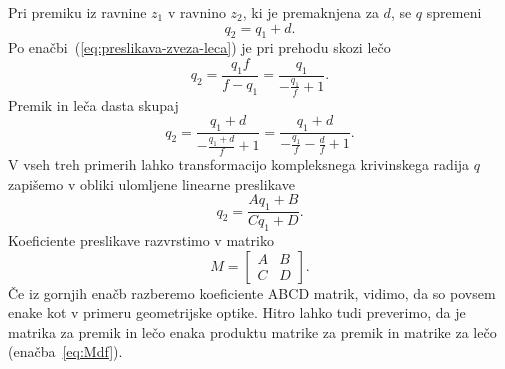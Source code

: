 Pri premiku iz ravnine $z_1$ v ravnino $z_2$, ki je premaknjena
za $d$, se $q$ spremeni 
\begin{equation}
q_2=q_1+d.
\end{equation}
Po enačbi~(\ref{eq:preslikava-zveza-leca}) je pri prehodu skozi lečo
\begin{equation}
q_2=\frac{q_1f}{f-q_1}=\frac{q_1}{-\frac{q_1}{f}+1}.
\end{equation}
Premik in leča dasta skupaj
\begin{equation}
q_2=\frac{q_1+d}{-\frac{q_1+d}{f}+1}=\frac{q_1+d}{-\frac{q_1}{f}-\frac{d}{f}+1}.
\end{equation}
V vseh treh primerih lahko transformacijo kompleksnega krivinskega radija 
$q$ zapišemo v obliki ulomljene
linearne preslikave 
\begin{equation}
q_2=\frac{Aq_1+B}{Cq_1+D}.
\label{eq:ulomljena-preslikava}
\end{equation}
Koeficiente preslikave razvrstimo v matriko 
\begin{equation}
M= \left[\begin{array}{cc}
A & B\\
C & D
\end{array}\right].
\end{equation}
Če iz gornjih enačb razberemo koeficiente ABCD matrik,
vidimo, da so povsem enake kot v primeru geometrijske optike. Hitro lahko tudi preverimo, 
da je matrika za premik in lečo enaka produktu matrike za premik in matrike za lečo
(enačba~\ref{eq:Mdf}). 


